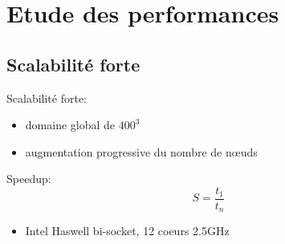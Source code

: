 \documentclass{beamer}
\begin{document}
%
%

\section{Etude des performances}
\subsection{Scalabilité forte}
\begin{frame}
  Scalabilité forte:
  \begin{itemize}
  \item domaine global de $400^3$
  \item augmentation progressive du nombre de nœuds
  \end{itemize}
  \vfill
  Speedup: $$S=\frac{t_1}{t_n}$$
\end{frame}


\begin{frame}
  \begin{itemize}
  \item Intel Haswell bi-socket, 12 coeurs 2.5GHz
  \end{itemize}%
  \centering
\end{frame}
\end{document}
